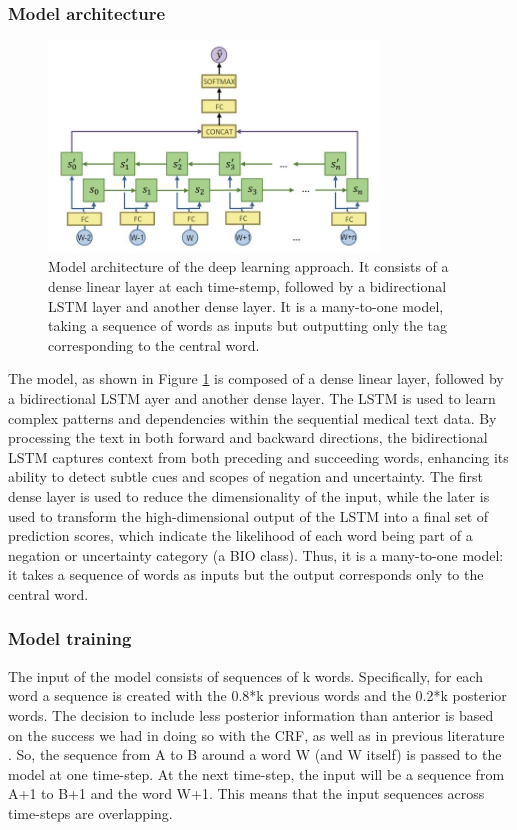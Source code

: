 \documentclass{article}
\begin{document}
\subsubsection*{Model architecture}
\begin{figure}[!t]
	\centering
	\includegraphics[height=5.6cm]{images/model.jpg}
	\captionsetup{width=0.9\textwidth}
	\caption{Model architecture of the deep learning approach. It consists of a dense linear layer at each time-stemp,
	followed by a bidirectional LSTM layer and another dense layer. It is a many-to-one model, taking a sequence of words as
	inputs but outputting only the tag corresponding to the central word.}
	\label{fig:model}
\end{figure}
The model, as shown in Figure \ref{fig:model} is composed of a dense linear layer, followed by a bidirectional LSTM 
ayer and another dense layer.
The LSTM is used to learn complex patterns and dependencies within the sequential medical text data. By processing
the text in both forward and backward directions, the bidirectional LSTM captures context from both preceding and 
succeeding words, enhancing its ability to detect subtle cues and scopes of negation and uncertainty. The first
dense layer is used to reduce the dimensionality of the input, while the later is used to transform the
high-dimensional output of the LSTM into a final set of prediction scores, which indicate the likelihood of each
word being part of a negation or uncertainty category (a BIO class). Thus, it is a many-to-one model: it takes a
sequence of words as inputs but the output corresponds only to the central word.

\subsubsection*{Model training}
The input of the model consists of sequences of k words. Specifically, for each word a sequence is created with
the 0.8*k previous words and the 0.2*k posterior words. The decision to include less posterior information than
anterior is based on the success we had in doing so with the CRF, as well as in previous literature \cite{lstm1}
\cite{lstm2}. So, the sequence from A to B around a word W (and W itself) is passed to the model at one time-step.
At the next time-step, the input will be a sequence from A+1 to B+1 and the word W+1. This means that the input
sequences across time-steps are overlapping.
\end{document}
